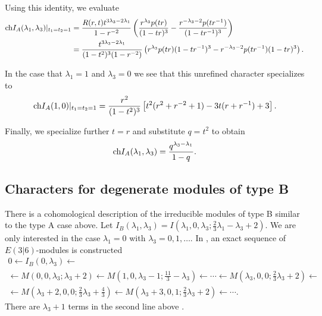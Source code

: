 \documentclass[11pt]{amsart}
\begin{document}
Using this identity, we evaluate
\begin{align*}
{\rm ch} I_A(\lambda_1,\lambda_3)|_{t_1=t_2=1} & = \frac{R(r,t) t^{3 \lambda_3 - 2 \lambda_1}}{1-r^{-2}} \left(\frac{r^{\lambda_3} p(tr)}{(1-tr)^3} - \frac{r^{-\lambda_3-2}p(tr^{-1})}{(1-tr^{-1})^3} \right) \\ 
& = \frac{t^{3 \lambda_3-2\lambda_1}}{(1-t^2)^3(1-r^{-2})} \left(r^{\lambda_3} p(tr) (1-tr^{-1})^3 - r^{-\lambda_3-2} p(tr^{-1})(1-tr)^3 \right) .
\end{align*}

In the case that $\lambda_1 = 1$ and $\lambda_3 = 0$ we see that this unrefined character specializes to
\[
{\rm ch} I_A(1,0)|_{t_1=t_2=1} = \frac{r^2}{(1-t^2)^3} \left[ t^2 (r^2 + r^{-2} + 1) - 3 t (r + r^{-1}) + 3 \right] .
\]

Finally, we specialize further $t=r$ and substitute $q = t^2$ to obtain
\[
{\rm ch} I_A(\lambda_1,\lambda_3) = \frac{q^{\lambda_3 - \lambda_1}}{1-q} .
\]

\subsection{Characters for degenerate modules of type B} \label{s:typeB}

There is a cohomological description of the irreducible modules of type B similar to the type A case above.
Let $I_B(\lambda_1,\lambda_3) = I(\lambda_1,0,\lambda_3;\frac23 \lambda_1 - \lambda_3+2)$. 
We are only interested in the case $\lambda_1 = 0$ with $\lambda_3=0,1,\ldots$.  
In \cite{KR2}, an exact sequence of $E(3|6)$-modules is constructed
\begin{multline}\label{eqn:les1}
0 \leftarrow  I_B(0,\lambda_3) \leftarrow \\ \leftarrow M(0,0,\lambda_3;\lambda_3 + 2) \leftarrow  M(1,0,\lambda_3-1;\frac{11}{3} - \lambda_3)  \leftarrow \cdots \leftarrow M(\lambda_3, 0, 0;\frac23 \lambda_3 +2) \leftarrow \\
 \leftarrow M(\lambda_3+2, 0, 0; \frac23 \lambda_3 + \frac43) \leftarrow M(\lambda_3+3, 0, 1; \frac23 \lambda_3 + 2) \leftarrow \cdots .
\end{multline}
There are $\lambda_3+1$ terms in the second line above .  


\parsec[s:typeBunrefinedKR]
\end{document}
